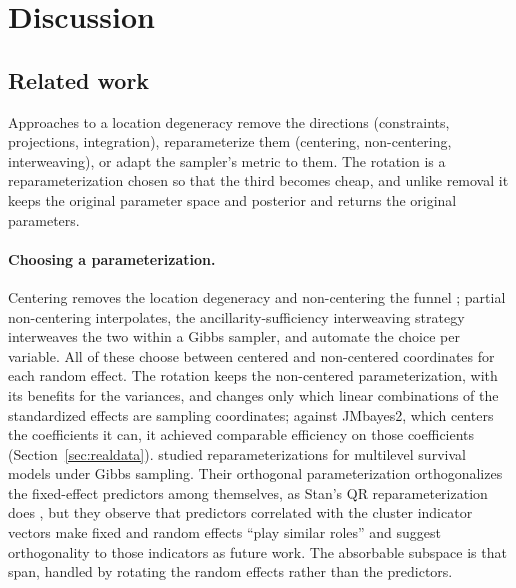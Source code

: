 \section{Discussion}\label{sec:discussion}

\subsection{Related work}\label{sec:related}

Approaches to a location degeneracy remove the directions (constraints,
projections, integration), reparameterize them (centering, non-centering,
interweaving), or adapt the sampler's metric to them. The rotation is a
reparameterization chosen so that the third becomes cheap, and unlike
removal it keeps the original parameter space and posterior and returns
the original parameters.

\paragraph{Choosing a parameterization.} Centering
\citep{gelfand1995,gelfand1996} removes the location degeneracy and
non-centering the funnel \citep{papaspiliopoulos2003,papaspiliopoulos2007};
partial non-centering interpolates, the ancillarity-sufficiency
interweaving strategy \citep{yu2011} interweaves the
two within a Gibbs sampler, and \citet{gorinova2020} automate the choice
per variable. All of these choose between centered and non-centered
coordinates for each random effect. The rotation
keeps the non-centered parameterization, with its benefits for the
variances, and changes only which linear combinations of the standardized
effects are sampling coordinates; against JMbayes2, which centers the
coefficients it can, it achieved comparable efficiency on those
coefficients (Section~\ref{sec:realdata}). \citet{browne2009} studied
reparameterizations for multilevel survival models under Gibbs sampling.
Their orthogonal parameterization orthogonalizes the fixed-effect
predictors among themselves, as Stan's QR reparameterization does
\citep{stanug}, but they observe that predictors correlated with the
cluster indicator vectors make fixed and random effects ``play similar
roles'' and suggest orthogonality to those indicators as future work. The
absorbable subspace is that span, handled by rotating the random effects
rather than the predictors.

